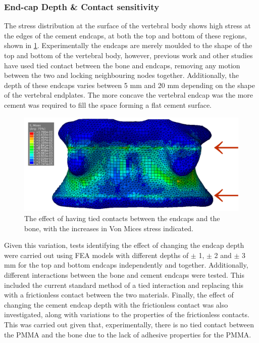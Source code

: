 \subsubsection{End-cap Depth \& Contact sensitivity}

The stress distribution at the surface of the vertebral body shows high stress at the edges of the cement endcaps, at both the top and bottom of these regions, shown in \cref{fig:stress_lines}.
Experimentally the endcaps are merely moulded to the shape of the top and bottom of the vertebral body, however, previous work and other studies have used tied contact between the bone and endcaps, removing any motion between the two and locking neighbouring nodes together.
Additionally, the depth of these endcaps varies between 5 mm and 20 mm depending on the shape of the vertebral endplates.
The more concave the vertebral endcap was the more cement was required to fill the space forming a flat cement surface.

\begin{figure}[h!]
\centering
\includegraphics[width=.65\textwidth]{Chapters/Chapter_HT_images/stress_lines.pdf}
\caption{The effect of having tied contacts between the endcaps and the bone, with the increases in Von Mices stress indicated.}
\label{fig:stress_lines}
\end{figure}


Given this variation, tests identifying the effect of changing the endcap depth were carried out using FEA models with different depths of $\pm$ 1, $\pm$ 2 and $\pm$ 3 mm for the top and bottom endcaps independently and together.
Additionally, different interactions between the bone and cement endcaps were tested.
This included the current standard method of a tied interaction and replacing this with a frictionless contact between the two materials.
Finally, the effect of changing the cement endcap depth with the frictionless contact was also investigated, along with variations to the properties of the frictionless contacts.
This was carried out given that, experimentally, there is no tied contact between the PMMA and the bone due to the lack of adhesive properties for the PMMA.

